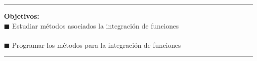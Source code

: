\documentclass[10pt,letterpaper]{article}
\begin{document}
\begin{minipage}[c]{5cm}
\begin{center}
{{\begin{minipage}[l][21cm]{5cm}
{\color{white}\rule[0.1cm]{5cm}{0.01cm}}
		{\color{ContenidosObjetivos} \textbf{ \small Objetivos:}}\\
					
{\footnotesize
{ \tiny $\blacksquare$} Estudiar métodos asociados la integración de funciones \\ \\
{ \tiny $\blacksquare$} Programar los métodos para
la integración de funciones
}

{\color{white}\rule[0.1cm]{5cm}{0.01cm}}\\

%

\end{minipage}
}}
\end{center}
\end{minipage}	 


\newpage
\end{document}

